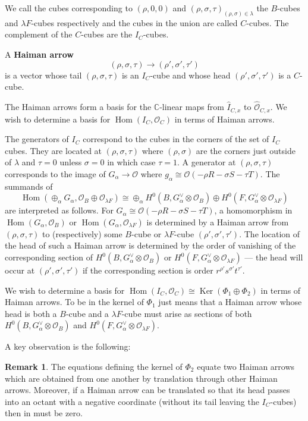 \documentclass{amsart}
\theoremstyle{definition}
\newtheorem{remark}[theorem]{Remark}
\newcommand{\CC} {\mathbb{C}}          %
\renewcommand{\O}{\mathcal{O}}
\newcommand{\Hom}{\operatorname{Hom}}
\newcommand{\Ker}{\operatorname{Ker}}
\renewcommand{\hat}{\widehat}
\begin{document}
We call the cubes corresponding to $(\rho ,0,0)$ and $(\rho ,\sigma
,\tau )_{(\rho ,\sigma )\in \lambda}$ the $B$-cubes and $\lambda
F$-cubes respectively and the cubes in the union are called
$C$-cubes. The complement of the $C$-cubes are the $I_{C}$-cubes.

A \textbf{Haiman arrow} 
\[
(\rho ,\sigma ,\tau )\to (\rho ',\sigma ',\tau ')
\]
is a vector whose tail $(\rho ,\sigma ,\tau )$ is an $I_{C}$-cube and
whose head $(\rho ',\sigma ',\tau ')$ is a $C$-cube.

The Haiman arrows form a basis for the $\CC$-linear maps from
$\widehat{I}_{C,x}$ to $\hat{\O}_{C,x}$. We wish to determine a basis
for $\Hom (I_{C},\O_{C})$ in terms of Haiman arrows.

The generators of $I_{C}$ correspond to the cubes in the corners of
the set of $I_{C}$ cubes. They are located at $(\rho ,\sigma ,\tau )$
where $(\rho ,\sigma )$ are the corners just outside of $\lambda$ and
$\tau =0$ unless $\sigma =0$ in which case $\tau =1$. A generator at
$(\rho ,\sigma ,\tau )$ corresponds to the image of $G_{\alpha}\to
\O$ where $g_{\alpha}\cong \O (-\rho R-\sigma S-\tau T)$. The summands
of 
\[
\Hom (\oplus_{\alpha}G_{\alpha},\O_{B}\oplus \O_{\lambda F}) \cong
\oplus_{\alpha} H^{0}(B,G_{\alpha}^{\vee}\otimes \O_{B})\oplus
H^{0}(F,G_{\alpha}^{\vee}\otimes \O_{\lambda F})
\]
are interpreted as follows. For $G_{\alpha}\cong \O (-\rho R-\sigma
S-\tau T)$, a homomorphism in $\Hom (G_{\alpha},\O_{B})$ or $\Hom
(G_{\alpha},\O_{\lambda F})$ is determined by a Haiman arrow from
$(\rho ,\sigma ,\tau )$ to (respectively) some $B$-cube or $\lambda
F$-cube $(\rho ',\sigma ',\tau ').$ The location of the head of such a
Haiman arrow is determined by the order of vanishing of the
corresponding section of $H^{0}(B,G_{\alpha}^{\vee}\otimes \O_{B})$ or
$H^{0}(F,G_{\alpha}^{\vee}\otimes \O_{\lambda F})$ --- the head will
occur at $(\rho ',\sigma ',\tau ')$ if the corresponding section is
order $r^{\rho '}s^{\sigma '}t^{\tau '}$.

We wish to determine a basis for $\Hom (I_{C},\O_{C})\cong \Ker
(\Phi_{1}\oplus \Phi_{2})$ in terms of Haiman arrows. To be in the
kernel of $\Phi_{1}$ just means that a Haiman arrow whose head is both
a $B$-cube and a $\lambda F$-cube must arise as sections of both
$H^{0}(B,G_{\alpha}^{\vee}\otimes \O_{B})$ and
$H^{0}(F,G_{\alpha}^{\vee}\otimes \O_{\lambda F})$.

A key observation is the following:
\begin{remark}\label{rem: ker of phi2 gives equations equating
translatedarrows}
The equations defining the kernel of $\Phi_{2}$ equate two Haiman
arrows which are obtained from one another by translation through
other Haiman arrows. Moreover, if a Haiman arrow can be translated so
that its head passes into an octant with a negative coordinate
(without its tail leaving the $I_{C}$-cubes) then in must be zero. 
\end{remark}
\end{document}
